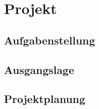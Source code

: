 \section{Projekt}
\subsection{Aufgabenstellung}
\subsection{Ausgangslage}
\subsection{Projektplanung}